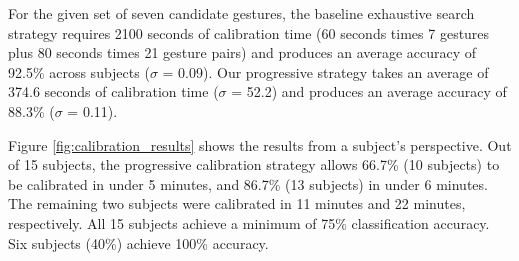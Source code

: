 
For the given set of seven candidate gestures, the baseline exhaustive search strategy requires 2100 seconds of calibration time (60 seconds times 7 gestures plus 80 seconds times 21 gesture pairs) and produces an average accuracy of 92.5\% across subjects (\textit{$\sigma$} = 0.09). Our progressive strategy takes an average of 374.6 seconds of calibration time (\textit{$\sigma$} = 52.2) and produces an average accuracy of 88.3\% (\textit{$\sigma$} = 0.11).

Figure \ref{fig:calibration_results} shows the results from a subject's perspective. Out of 15 subjects, the progressive calibration strategy allows 66.7\% (10 subjects) to be calibrated in under 5 minutes, and 86.7\% (13 subjects) in under 6 minutes. The remaining two subjects were calibrated in 11 minutes and 22 minutes, respectively. All 15 subjects achieve a minimum of 75\% classification accuracy. Six subjects (40\%) achieve 100\% accuracy.

